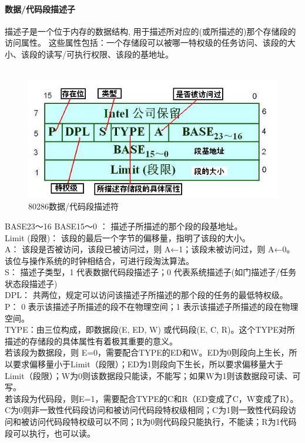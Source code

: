 \documentclass[12pt]{article}
\begin{document}
\paragraph{数据/代码段描述子}
描述子是一个位于内存的数据结构, 用于描述所对应的(或所描述的)那个存储段的访问属性。 这些属性包括：一个存储段可以被哪一特权级的任务访问、该段的大小、该段的读写/可执行权限、该段的基地址。\\\\
\begin{figure}[htbp]
\centering
\includegraphics[scale=0.7]{fig/17.png}
\caption{80286数据/代码段描述符}
\label{fig:80286 Segment Discriptor}
\end{figure}
BASE23～16 BASE15～0 ： 描述子所描述的那个段的段基地址。\\
Limit (段限)： 该段的最后一个字节的偏移量，指明了该段的大小。\\
A： 该段是否被访问，该段已被访问过，则 A←1；该段未被访问过，则 A←0。该位与操作系统的时钟相结合，可进行段淘汰算法。\\
S： 描述子类型，1 代表数据代码段描述子；0 代表系统描述子(如门描述子/任务状态段描述子)\\
DPL： 共两位，规定可以访问该描述子所描述的那个段的任务的最低特权级。\\
P： 0 表示该描述子所描述的段不在物理空间；1 表示该描述子所描述的段在物理空间。\\
TYPE：由三位构成，即数据段(E, ED, W) 或代码段(E, C, R)。这个TYPE对所描述的存储段的具体属性有着极其重要的意义。\\
若该段为数据段，则 E=0，需要配合TYPE的ED和W。ED为0则段向上生长，所以要求偏移量小于Limit（段限）；ED为1则段向下生长，所以要求偏移量大于Limit（段限）；W为0则该数据段只能读，不能写；如果W为1则该数据段可读、可写。\\
若该段为代码段，则E=1，需要配合TYPE的C和R（ED变成了C，W变成了R）。C为0则非一致性代码段访问和被访问代码段特权级相同；C为1则一致性代码段访问和被访问代码段特权级可以不同；R为0则代码段只能执行，不能读；R为1代码段可以执行，也可以读。
\end{document}
